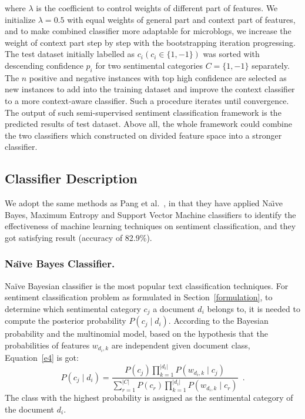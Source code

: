 \documentclass{llncs}
\begin{document}
where $ \lambda $ is the coefficient to control weights of different part of features. 
We initialize $ \lambda = 0.5 $ with equal weights of general part and context part of features, and to make combined classifier more adaptable for microblogs, we  increase the weight of context part step by step with the bootstrapping iteration progressing.
The test dataset initially labelled as $ c_{i} \left( c_{i} \in \lbrace 1, -1\rbrace \right)$ was sorted with descending confidence $ p_{i} $ for two sentimental categories $ C=\lbrace 1,-1\rbrace $ separately.
The $ n $  positive and negative instances with top high confidence are selected as new instances to add into the training dataset and improve the context classifier to a more context-aware classifier. 
Such a procedure iterates until convergence.
The output of such semi-supervised sentiment classification framework is the predicted results of test dataset. 
Above all, the whole framework could combine the two classifiers which constructed on divided feature space into a stronger classifier. 

\subsection{Classifier Description}
\label{classifier}

We adopt the same methods as Pang et al.~\cite{xsongx:b4}, in that they have applied Na\"\i ve Bayes, Maximum Entropy and Support Vector Machine classifiers to identify the effectiveness of machine learning techniques on sentiment classification, and they got satisfying result (accuracy of 82.9\%).
\subsubsection{Na\"\i ve Bayes Classifier.}
\label{bayes}
Naïve Bayesian classifier is the most popular text classification techniques.
For sentiment classification problem as formulated in Section~\ref{formulation}, to determine which sentimental category $ c_{j} $ a document $ d_{i} $ belongs to, it is needed to compute the posterior probability $ P \left(c_{j} \mid d_{i} \right)$. 
According to the Bayesian probability and the multinomial model, based on the hypothesis that the probabilities of features $ w_{d_{i},k} $ are independent given document class, Equation~\ref{e4} is got:
\begin{equation}
\label{e4}
P \left(c_{j} \mid d_{i} \right) = \frac{P \left( c_{j} \right)\prod_{k=1}^{| d_{i} |} P \left( w_{d_{i},k} \mid c_{j} \right)}{\sum_{r=1}^{|C|}P \left( c_{r} \right)\prod_{k=1}^{| d_{i} |} P \left( w_{d_{i},k} \mid c_{r} \right)} \enspace .
\end{equation}
The class with the highest probability is assigned as the sentimental category of the document $ d_{i} $. 
\end{document}
